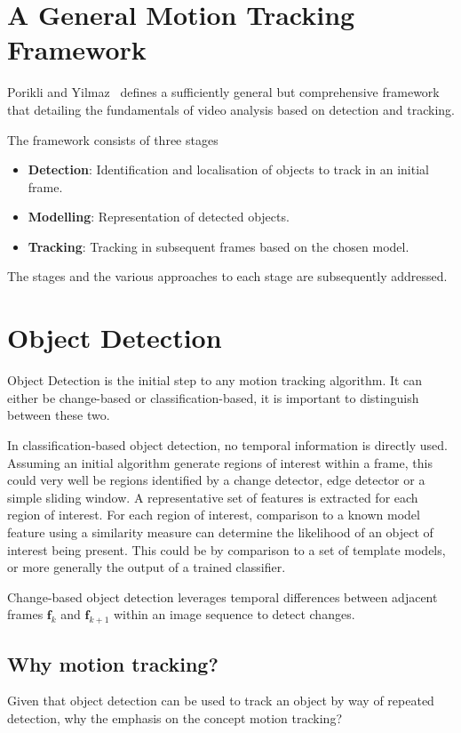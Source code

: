 \section{A General Motion Tracking Framework}
Porikli and Yilmaz~\cite{Porikli2012} defines a sufficiently general but
comprehensive framework that detailing the fundamentals of video
analysis based on detection and tracking. 

The framework consists of three stages
\begin{itemize}
    \item \textbf{Detection}: Identification and localisation of objects to
        track in an initial frame.
    \item \textbf{Modelling}: Representation of detected objects.
    \item \textbf{Tracking}: Tracking in subsequent frames based on the chosen
        model.
\end{itemize}

The stages and the various approaches to each stage are subsequently addressed.

\section{Object Detection}\label{literature_review_object_detection}
Object Detection is the initial step to any motion tracking algorithm. It can
either be change-based or classification-based, it is important to distinguish
between these two.

In classification-based object detection, no temporal information is directly
used. Assuming an initial algorithm generate regions of interest within a frame, this
could very well be regions identified by a change detector, edge detector or a
simple sliding window. A representative set of features is extracted for each
region of interest. For each region of interest, comparison to a known model
feature using a similarity measure can determine the likelihood of an object of
interest being present. 
This could be by comparison to a set of template models, or more generally the
output of a trained classifier.

Change-based object detection leverages temporal differences between adjacent frames
$\mathbf{f}_k$ and $\mathbf{f}_{k+1}$ within an image sequence to detect
changes. 

\subsection{Why motion tracking?}
Given that object detection can be used to track an object by way of repeated
detection, why the emphasis on the concept motion tracking?

